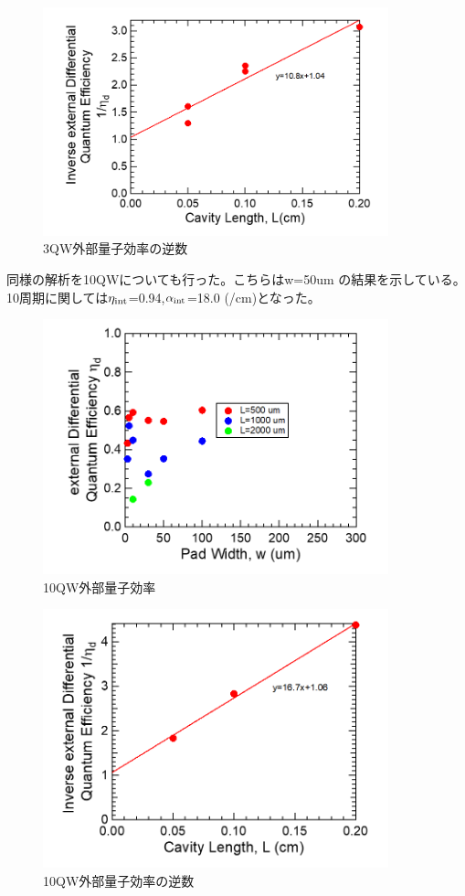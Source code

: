 {\begin{figure}[h]
	\centering
	\includegraphics[width=10cm]{figure/fig_3_1_3QW_broadcontact_id_inverse.png}
	\caption{3QW外部量子効率の逆数}
	\label{fig:fig_3_1_3QW_broadcontact_id_inverse}
\end{figure}
\clearpage
同様の解析を10QWについても行った。こちらはw=50um の結果を示している。10周期に関しては$\eta_{\rm{int}}$=0.94,$\alpha_{\rm{int}}$=18.0 (/cm)となった。
\begin{figure}[h]
	\centering
	\includegraphics[width=10cm]{figure/fig_3_1_10QW_broadcontact_id.png}
	\caption{10QW外部量子効率}
	\label{fig:fig_3_1_10QW_broadcontact_id}
\end{figure}

\begin{figure}[h]
	\centering
	\includegraphics[width=10cm]{figure/fig_3_1_10QW_broadcontact_id_inverse.png}
	\caption{10QW外部量子効率の逆数}
	\label{fig:fig_3_1_10QW_broadcontact_id_inverse}
\end{figure}


}
